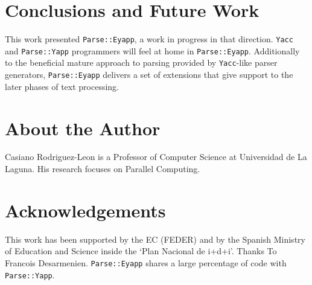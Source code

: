 \documentclass[times, 10pt,%
]{article}
\newcommand{\code}[1]{{\tt #1}}
\begin{document}
\section{Conclusions and Future Work}

This work presented \code{Parse::Eyapp}, a work in progress in that direction.
\code{Yacc} and \code{Parse::Yapp} programmers will feel at home
in \code{Parse::Eyapp}. 
Additionally to the beneficial mature approach to parsing provided by
\code{Yacc}-like parser generators,
\code{Parse::Eyapp} delivers a set of extensions
that give support to the later phases
of text processing.

\section{About the Author}
Casiano Rodriguez-Leon is a Professor of Computer Science at Universidad
de La Laguna. His research focuses on Parallel Computing. 


\section{Acknowledgements}

This work has been supported by the {\sc EC (FEDER)} and by
the Spanish Ministry of Education and Science inside the
`Plan Nacional de {\sc i+d+}i'.
Thanks To Francois Desarmenien. \code{Parse::Eyapp} shares a large percentage 
of code with \code{Parse::Yapp}.





\label{end:of:file}
\end{document}
